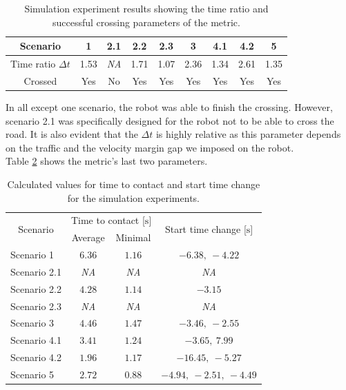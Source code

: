         \begin{table}[H]
            \centering
            \begin{tabular}{|c||c|c|c|c|c|c|c|c|}
                \hline
                Scenario & 1 & 2.1 & 2.2 & 2.3 & 3 & 4.1 & 4.2 & 5 \\
                \hline
                Time ratio $\Delta t$ & 1.53 & \emph{NA} & 1.71 & 1.07 & 2.36 & 1.34 & 2.61 & 1.35 \\
                \hline
                Crossed & Yes & No & Yes & Yes & Yes & Yes & Yes & Yes \\
                \hline
            \end{tabular}
            \caption{Simulation experiment results showing the time ratio and successful crossing parameters of the metric.}
            \label{tab:met1}
        \end{table}
        \noindent In all except one scenario, the robot was able to finish the crossing. However, scenario 2.1 was specifically designed for the robot not to be able to cross the road. It is also evident that the $\Delta t$ is highly relative as this parameter depends on the traffic and the velocity margin gap we imposed on the robot.\\
        Table \ref{tab:times} shows the metric's last two parameters.
        \begin{table}[H]
            \centering
            \begin{tabular}{|c|c c|c|}
                \hline
                \multirow{2}{4em}{Scenario} & \multicolumn{2}{c|}{Time to contact [$\si{\s}$]} & \multirow{2}{9em}{Start time change [$\si{\s}$]}\\
                & Average & Minimal & \\
                \hline\hline
                \multicolumn{1}{|l|}{Scenario 1} & $6.36$ & $1.16$ & $-6.38,\ -4.22$ \\
                \hline
                Scenario 2.1 & \emph{NA} & \emph{NA} & \emph{NA} \\
                \hline
                Scenario 2.2 & $4.28$ & $1.14$ & $-3.15$ \\
                \hline
                Scenario 2.3 & \emph{NA} & \emph{NA} & \emph{NA} \\
                \hline
                \multicolumn{1}{|l|}{Scenario 3} & $4.46$ & $1.47$ & $-3.46,\ -2.55$ \\
                \hline
                Scenario 4.1 & $3.41$ & $1.24$ & $-3.65,\ 7.99$ \\
                \hline
                Scenario 4.2 & $1.96$ & $1.17$ & $-16.45,\ -5.27$ \\
                \hline
                \multicolumn{1}{|l|}{Scenario 5} & $2.72$ & $0.88$ & $-4.94,\ -2.51,\ -4.49$ \\
                \hline
            \end{tabular}
            \caption{Calculated values for time to contact and start time change for the simulation experiments.}
            \label{tab:times}
        \end{table}
